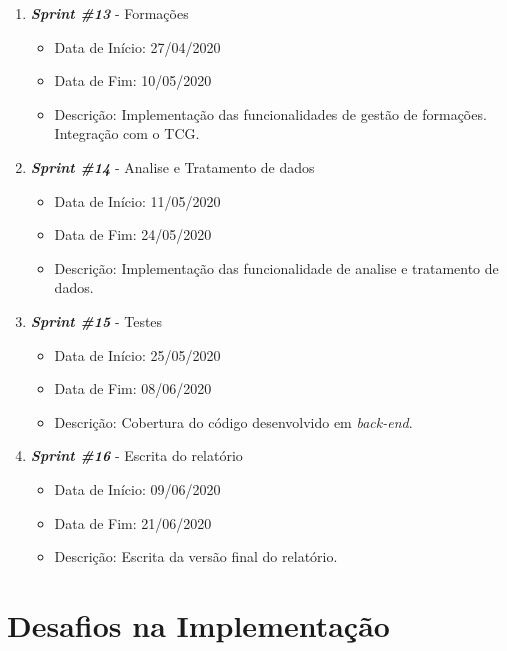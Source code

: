 \begin{enumerate}
\begin{itemize}
	\end{itemize}
	\item \textit{\textbf{Sprint \#13}} - Formações
	\begin{itemize}
		\item Data de Início: 27/04/2020
		\item Data de Fim: 10/05/2020
		\item Descrição: Implementação das funcionalidades de gestão de formações. Integração com o TCG.
	\end{itemize}
	\item \textit{\textbf{Sprint \#14}} - Analise e Tratamento de dados
	\begin{itemize}
		\item Data de Início: 11/05/2020
		\item Data de Fim: 24/05/2020
		\item Descrição: Implementação das funcionalidade de analise e tratamento de dados. 
	\end{itemize}
	\item \textit{\textbf{Sprint \#15}} - Testes
	\begin{itemize}
		\item Data de Início: 25/05/2020
		\item Data de Fim: 08/06/2020
		\item Descrição: Cobertura do código desenvolvido em \textit{back-end}.
	\end{itemize}
	\item \textit{\textbf{Sprint \#16}} - Escrita do relatório
	\begin{itemize}
		\item Data de Início: 09/06/2020
		\item Data de Fim: 21/06/2020
		\item Descrição: Escrita da versão final do relatório.
	\end{itemize}
\end{enumerate}


\section{Desafios na Implementação}
\label{sec:dificuldades}


\glsresetall
